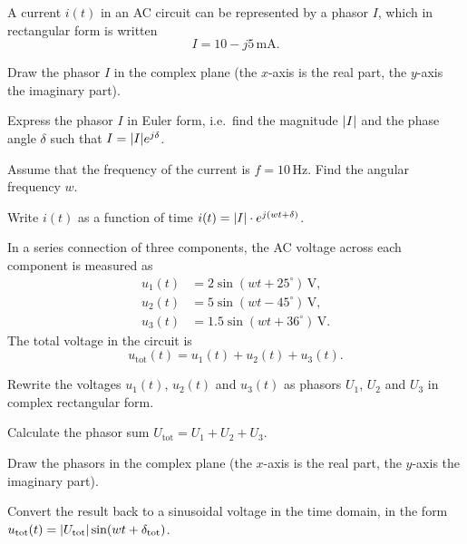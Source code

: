 A current $i(t)$ in an AC circuit can be represented by a phasor $I$, which in rectangular form
is written
\[
  I = 10 - j5\,\text{mA}.
\]
\begin{parts}
  \item Draw the phasor $I$ in the complex plane (the $x$-axis is the real part, the $y$-axis the
    imaginary part).
  \item Express the phasor $I$ in Euler form, i.e.\ find the magnitude $\lvert I\rvert$ and the phase
    angle $\delta$ such that $I = \lvert I\rvert e^{j\delta}$.
  \item Assume that the frequency of the current is $f = 10\,\text{Hz}$. Find the angular
    frequency $w$.
  \item Write $i(t)$ as a function of time $i(t) = \lvert I\rvert \cdot e^{j(wt + \delta)}$.
\end{parts}

In a series connection of three components, the AC voltage across each component is measured as
\begin{align*}
  u_1(t) &= 2\sin(wt + 25^{\circ})\,\text{V}, \\
  u_2(t) &= 5\sin(wt - 45^{\circ})\,\text{V}, \\
  u_3(t) &= 1.5\sin(wt + 36^{\circ})\,\text{V}.
\end{align*}
The total voltage in the circuit is
\[
  u_{\text{tot}}(t) = u_1(t) + u_2(t) + u_3(t).
\]
\begin{parts}
  \item Rewrite the voltages $u_1(t)$, $u_2(t)$ and $u_3(t)$ as phasors $U_1$, $U_2$ and $U_3$ in
    complex rectangular form.
  \item Calculate the phasor sum $U_{\text{tot}} = U_1 + U_2 + U_3$.
  \item Draw the phasors in the complex plane (the $x$-axis is the real part, the $y$-axis the
    imaginary part).
  \item Convert the result back to a sinusoidal voltage in the time domain, in the form
    $u_{\text{tot}}(t) = \lvert U_{\text{tot}}\rvert \sin(wt + \delta_{\text{tot}})$.
\end{parts}
